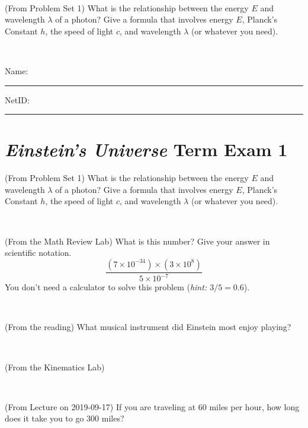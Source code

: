 \documentclass[12pt, letterpaper]{article}
\begin{document}
\vfill ~

\begin{problem} (From Problem Set 1)
What is the relationship between the energy $E$ and wavelength
$\lambda$ of a photon? Give a formula that involves energy $E$,
Planck's Constant $h$, the speed of light $c$, and wavelength
$\lambda$ (or whatever you need).
\end{problem}

\vfill ~


\cleardoublepage



\noindent
Name: \rule[-1ex]{0.60\textwidth}{0.1pt}
NetID: \rule[-1ex]{0.20\textwidth}{0.1pt}

\section*{\textsl{Einstein's Universe} Term Exam 1}
\setcounter{problem}{1}


\begin{problem} (From Problem Set 1)
What is the relationship between the energy $E$ and wavelength
$\lambda$ of a photon? Give a formula that involves energy $E$,
Planck's Constant $h$, the speed of light $c$, and wavelength
$\lambda$ (or whatever you need).
\end{problem}

\vfill ~

\begin{problem} (From the Math Review Lab)
What is this number? Give your answer in scientific notation.
$$
\frac{(7\times10^{-34})\times(3\times10^8)}{5\times10^{-7}}
$$
You don't need a calculator to solve this problem (\textit{hint: $3/5=0.6$}).
\end{problem}


\vfill ~

\begin{problem} (From the reading)
What musical instrument did Einstein most enjoy playing?
\end{problem}


\vfill ~

\begin{problem} (From the Kinematics Lab)

\end{problem}


\vfill ~


\clearpage


\begin{problem} (From Lecture on 2019-09-17)
If you are traveling at 60 miles per hour, how long does
it take you to go 300 miles?
\end{problem}
\end{document}
